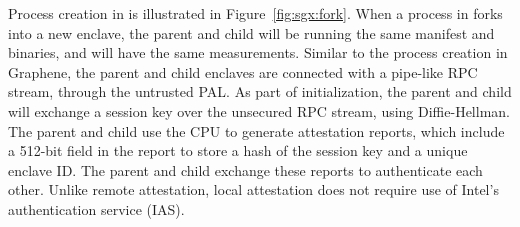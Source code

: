 \begin{comment}
To secure process creation across enclaves,
\graphenesgx{} is capable of building up the trust to newly launched enclaves,
through cooperation with an untrusted host.
Once a clean and trusted new enclave is launched,
The parent process will send a snapshot to the new one,
to create a clone of itself.
Snapshotting and migrating process states
is a feature robustly implemented and heavily used in \graphene{} \libos{},
of which we simply inherit the design.
\end{comment}

Process creation in \graphenesgx{} is illustrated in Figure~\ref{fig:sgx:fork}.
When a process in \graphenesgx{} forks into a new enclave,
the parent and child will be running the same manifest and binaries,
and will have the same measurements.
Similar to the process creation in Graphene, the parent and child enclaves are connected with a pipe-like RPC stream, through the untrusted PAL.
As part of initialization, the parent and child will exchange a session key over the unsecured RPC stream, using Diffie-Hellman.
The parent and child use the CPU to generate attestation reports, 
which include a 
512-bit field in the report to store 
a hash of the session key
and a unique enclave ID.
The parent and child exchange these reports to authenticate each other.
Unlike remote attestation, local attestation does not require 
use of Intel's authentication service (IAS).
